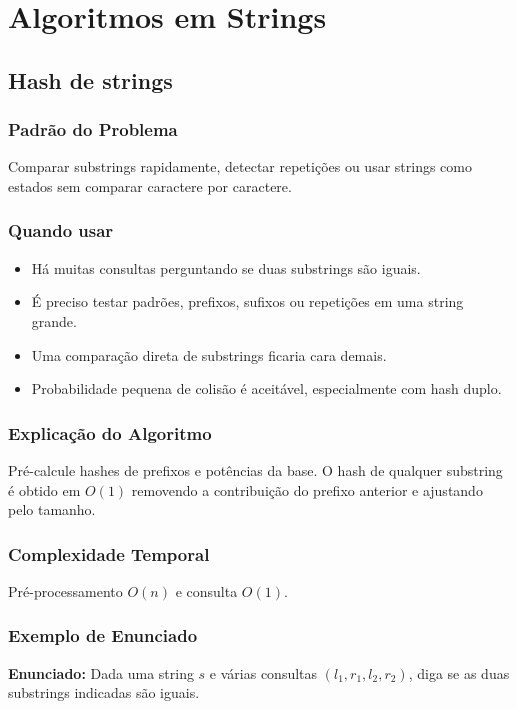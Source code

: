\chapter{Algoritmos em Strings}

\section{Hash de strings}

\subsection{Padrão do Problema}
Comparar substrings rapidamente, detectar repetições ou usar strings como estados sem comparar caractere por caractere.

\subsection{Quando usar}
\begin{itemize}[nosep]
  \item Há muitas consultas perguntando se duas substrings são iguais.
  \item É preciso testar padrões, prefixos, sufixos ou repetições em uma string grande.
  \item Uma comparação direta de substrings ficaria cara demais.
  \item Probabilidade pequena de colisão é aceitável, especialmente com hash duplo.
\end{itemize}

\subsection{Explicação do Algoritmo}
Pré-calcule hashes de prefixos e potências da base. O hash de qualquer substring é obtido em $O(1)$ removendo a contribuição do prefixo anterior e ajustando pelo tamanho.

\subsection{Complexidade Temporal}
Pré-processamento $O(n)$ e consulta $O(1)$.

\subsection{Exemplo de Enunciado}
\begin{exemplodiabox}
\textbf{Enunciado:} Dada uma string $s$ e várias consultas $(l_1,r_1,l_2,r_2)$, diga se as duas substrings indicadas são iguais.
\end{exemplodiabox}

